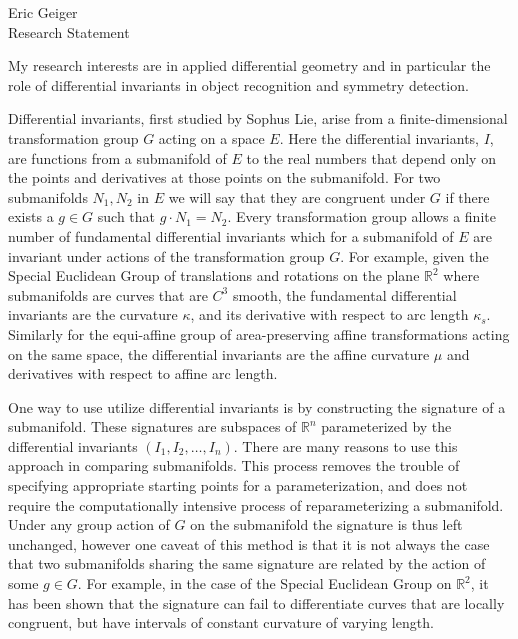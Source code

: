 \documentclass[12pt]{letter}
\begin{document}
\begin{center}
  Eric Geiger \\
  Research Statement
\end{center}

\quad My research interests are in applied differential geometry and in particular the role of differential invariants in object recognition and symmetry detection.

\quad Differential invariants, first studied by Sophus Lie, arise from a finite-dimensional transformation group $G$ acting on a space $E$.  Here the differential invariants, $I$, are functions from a submanifold of $E$ to the real numbers that depend only on the points and derivatives at those points on the submanifold.
For two submanifolds $N_1, N_2$ in $E$ we will say that they are congruent under $G$ if there exists a $g \in G$ such that $g \cdot N_1 = N_2$.
Every transformation group allows a finite number of fundamental differential invariants which for a submanifold of $E$ are invariant under actions of the transformation group $G$.
For example, given the Special Euclidean Group of translations and rotations on the plane $\mathbb{R}^2$ where submanifolds are curves that are $C^3$ smooth, the fundamental differential invariants are the curvature $\kappa$, and its derivative with respect to arc length $\kappa_s$.
Similarly for the equi-affine group of area-preserving affine transformations acting on the same space, the differential invariants are the affine curvature $\mu$ and derivatives with respect to affine arc length.

\quad One way to use utilize differential invariants is by constructing the signature of a submanifold. These signatures are subspaces of $\mathbb{R}^n$ parameterized by the differential invariants $(I_1, I_2, \dots, I_n)$.  There are many reasons to use this approach in comparing submanifolds. This process removes the trouble of specifying appropriate starting points for a parameterization, and does not require the computationally intensive process of reparameterizing a submanifold.  Under any group action of $G$ on the submanifold the signature is thus left unchanged, however one caveat of this method is that it is not always the case that two submanifolds sharing the same signature are related by the action of some $g \in G$. For example, in the case of the Special Euclidean Group on $\mathbb{R}^2$, it has been shown that the signature can fail to differentiate curves that are locally congruent, but have intervals of constant curvature of varying length.
\end{document}
